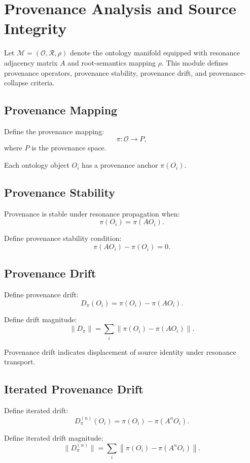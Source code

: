 \section{Provenance Analysis and Source Integrity}

Let $\mathcal{M} = (\mathcal{O}, \mathcal{R}, \rho)$ denote the ontology
manifold equipped with resonance adjacency matrix $A$ and root-semantics
mapping $\rho$. This module defines provenance operators, provenance
stability, provenance drift, and provenance-collapse criteria.

\subsection{Provenance Mapping}

Define the provenance mapping:
\[
\pi : \mathcal{O} \to P,
\]
where $P$ is the provenance space.

Each ontology object $O_i$ has a provenance anchor $\pi(O_i)$.

\subsection{Provenance Stability}

Provenance is stable under resonance propagation when:
\[
\pi(O_i) = \pi(A O_i).
\]

Define provenance stability condition:
\[
\pi(A O_i) - \pi(O_i) = 0.
\]

\subsection{Provenance Drift}

Define provenance drift:
\[
D_{\pi}(O_i) = \pi(O_i) - \pi(A O_i).
\]

Define drift magnitude:
\[
\|D_{\pi}\| = \sum_i \left\| \pi(O_i) - \pi(A O_i) \right\|.
\]

Provenance drift indicates displacement of source identity under resonance
transport.

\subsection{Iterated Provenance Drift}

Define iterated drift:
\[
D_{\pi}^{(n)}(O_i)
  = \pi(O_i) - \pi(A^n O_i).
\]

Define iterated drift magnitude:
\[
\|D_{\pi}^{(n)}\|
  = \sum_i \left\| \pi(O_i) - \pi(A^n O_i) \right\|.
\]

